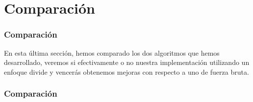 \documentclass{beamer}
\begin{document}
\section{Comparación} %
\begin{frame}
	\frametitle{Comparación}
	En esta última sección, hemos comparado los dos algoritmos que hemos desarrollado, veremos si efectivamente o no nuestra implementación utilizando un enfoque divide y vencerás obtenemos mejoras con respecto a uno de fuerza bruta.
	
\end{frame}

\begin{frame}
	\frametitle{Comparación}
	
	
\end{frame}
\end{document}
